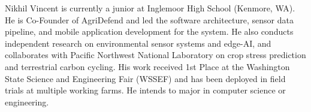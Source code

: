 \documentclass[10pt,twocolumn]{article}
\begin{document}
\bigskip
\noindent
\begin{IEEEbiographynophoto}{Nikhil Vincent}
is currently a junior at Inglemoor High School (Kenmore, WA). He is Co-Founder of AgriDefend and led the software architecture, sensor data pipeline, and mobile application development for the system. He also conducts independent research on environmental sensor systems and edge-AI, and collaborates with Pacific Northwest National Laboratory on crop stress prediction and terrestrial carbon cycling. His work received 1st Place at the Washington State Science and Engineering Fair (WSSEF) and has been deployed in field trials at multiple working farms. He intends to major in computer science or engineering.
\end{IEEEbiographynophoto}

\bigskip
\noindent
\end{document}
